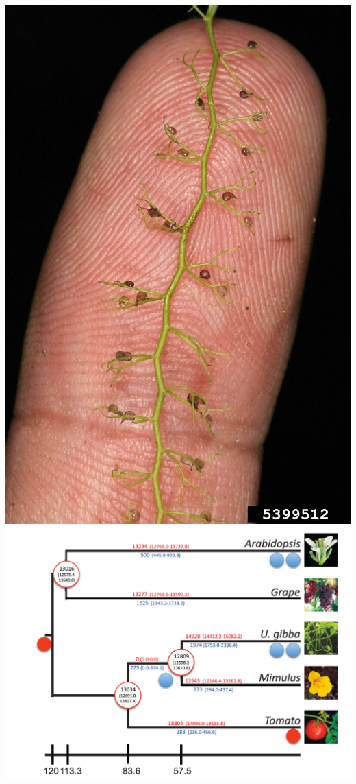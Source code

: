 \begin{frame}
\begin{columns}[c]
        \includegraphics[height=0.3\textheight]{images/utricularia-gibba-finger} \\
        \includegraphics[width=\textwidth]{images/U_gibba_tree}        
    \end{columns}  
\end{frame}